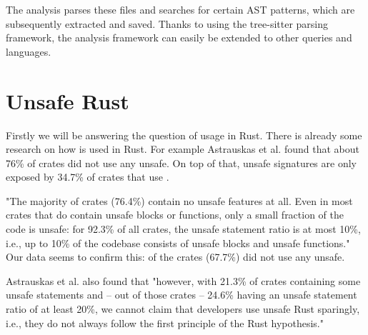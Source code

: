 \documentclass[twoside, english]{sdqthesis}
\theoremstyle{definition}
\begin{document}

The analysis parses these files and searches for certain AST patterns, which are subsequently extracted and saved.
Thanks to using the tree-sitter parsing framework, the analysis framework can easily be extended to other queries and languages.

\section{Unsafe Rust}\label{ss:unsafe-rust}

Firstly we will be answering the question of  usage in Rust.
There is already some research on how  is used in Rust. For example Astrauskas et al. \cite{astrauskas_how_2020} found that about 76\% of crates did not use any unsafe. On top of that, unsafe signatures are only exposed by 34.7\% of crates that use .

"The majority of crates (76.4\%) contain no unsafe features at all. Even in most crates that do contain unsafe blocks or functions, only a small fraction of the code is unsafe: for 92.3\% of all crates, the unsafe statement ratio is at most 10\%, i.e., up to 10\% of the codebase consists of unsafe blocks and unsafe functions." \cite[p. 13]{astrauskas_how_2020}
Our data seems to confirm this:  of the  crates (67.7\%) did not use any unsafe. 

Astrauskas et al. also found that "however, with 21.3\% of crates containing some unsafe statements and – out of those crates – 24.6\% having an unsafe statement ratio of at least 20\%, we cannot claim that developers use unsafe Rust sparingly, i.e., they do not always follow the first principle of the Rust hypothesis." \cite[p. 14]{astrauskas_how_2020}
\end{document}
